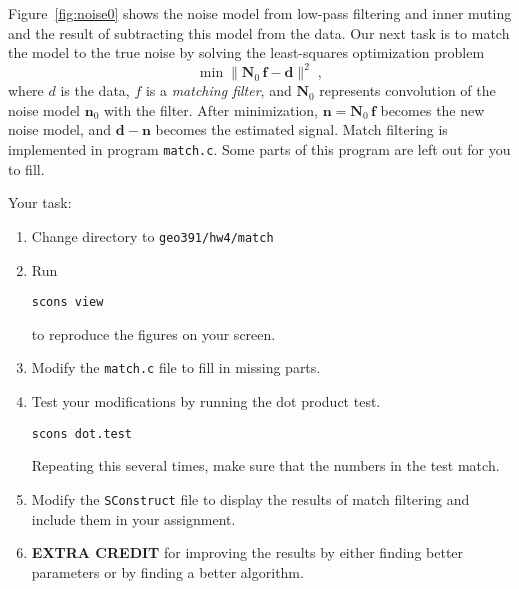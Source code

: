 
Figure~\ref{fig:noise0} shows the noise model from low-pass filtering
and inner muting and the result of subtracting this model from the
data. Our next task is to match the model to the true noise by solving
the least-squares optimization problem
\begin{equation}
\label{eq:ls}
\min \|\mathbf{N}_0\,\mathbf{f} - \mathbf{d}\|^2\;,
\end{equation}
where $d$ is the data, $f$ is a \emph{matching filter}, and
$\mathbf{N}_0$ represents convolution of the noise model
$\mathbf{n}_0$ with the filter. After minimization, $\mathbf{n} =
\mathbf{N}_0\,\mathbf{f}$ becomes the new noise model, and
$\mathbf{d}-\mathbf{n}$ becomes the estimated signal. Match filtering
is implemented in program \texttt{match.c}. Some parts of this program
are left out for you to fill.

\lstset{language=c,numbers=left,numberstyle=\tiny,showstringspaces=false}


Your task:
\begin{enumerate}
\item Change directory to \verb#geo391/hw4/match#
\item Run 
\begin{verbatim}
scons view
\end{verbatim}
to reproduce the figures on your screen.
\item Modify the \texttt{match.c} file to fill in missing parts.
\item Test your modifications by running the dot product test.
\begin{verbatim}
scons dot.test
\end{verbatim}
Repeating this several times, make sure that the numbers in the test match.
\item  Modify the \texttt{SConstruct} file to display the results of match filtering
and include them in your assignment.
\item \textbf{EXTRA CREDIT} for improving the results by either finding better parameters or by finding a better algorithm. 
\end{enumerate}

\lstset{language=python,numbers=left,numberstyle=\tiny,showstringspaces=false}


